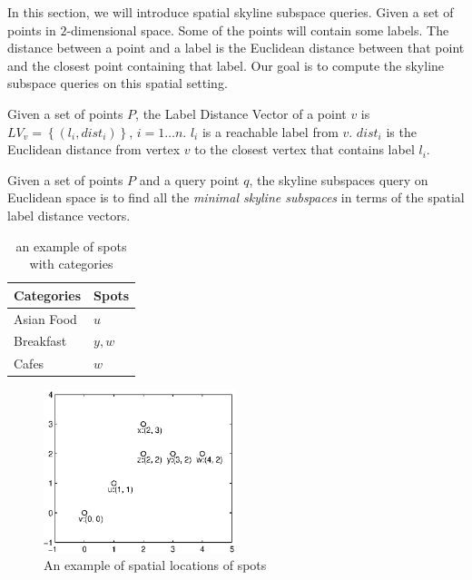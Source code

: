 In this section, we will introduce spatial skyline subspace queries. Given a set of points in $2$-dimensional space. Some of the points will contain some labels. The distance between a point and a label is the Euclidean distance between that point and the closest point containing that label. Our goal is to compute the skyline subspace queries on this spatial setting.

\begin{definition}
Given a set of points $P$, the Label Distance Vector of a point $v$ is $LV_v=\left\{\left(l_i, dist_i\right)\right\}$, $i = 1 \ldots n$. $l_i$ is a reachable label from $v$. $dist_i$ is the Euclidean distance from vertex $v$ to the closest vertex that contains label $l_i$.
\end{definition}

\begin{definition}
Given a set of points $P$ and a query point $q$, the skyline subspaces query on Euclidean space is to find all the \emph{minimal skyline subspaces} in terms of the spatial label distance vectors.
\end{definition}

\begin{table}[h]
    \centering
    \begin{tabular}{|l|l|}
    \hline
    Categories     & Spots \\ \hline
    Asian Food     & $u$     \\ \hline
    Breakfast      & $y, w$  \\ \hline
    Cafes          & $w$     \\ \hline
    \end{tabular}
    \caption{\label{tab:spot_category} an example of spots with categories}
    
\end{table}


\begin{figure}[h]
    \centering
    \includegraphics[width=0.5\textwidth]{figs/spatial_figure}
    \caption{\label{fig:spatial_map}An example of spatial locations of spots}
    
\end{figure}

